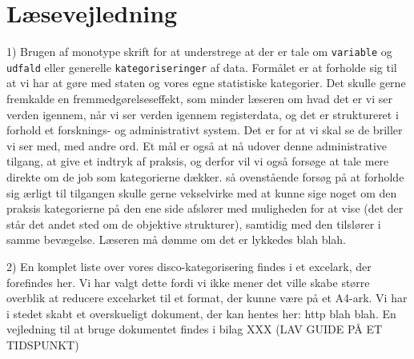 

\section{Læsevejledning \label{}}


1)
Brugen af monotype skrift for at understrege at der er tale om \texttt{variable} og \texttt{udfald} eller generelle \texttt{kategoriseringer} af data. Formålet er at forholde sig til at vi har at gøre med staten og vores egne statistiske kategorier. Det skulle gerne fremkalde en fremmedgørelseseffekt, som minder læseren om hvad det er vi ser verden igennem, når vi ser verden igennem registerdata, og det er struktureret i forhold et forsknings- og administrativt system. Det er for at vi skal se de briller vi ser med, med andre ord. Et mål er også at nå udover denne administrative tilgang, at give et indtryk af praksis, og derfor vil vi også forsøge at tale mere direkte om de job som kategorierne dækker. så ovenstående forsøg på at forholde sig ærligt til tilgangen skulle gerne vekselvirke med at kunne sige noget om den praksis kategorierne på den ene side afslører med muligheden for at vise (det der står det andet sted om de objektive strukturer), samtidig med den tilslører i samme bevægelse. Læseren må dømme om det er lykkedes blah blah.

2) 
En komplet liste over vores disco-kategorisering findes i et excelark, der forefindes her. Vi har valgt dette fordi vi ikke mener det ville skabe større overblik at reducere excelarket til et format, der kunne være på et A4-ark. Vi har i stedet skabt et overskueligt dokument, der kan hentes her: http blah blah. En vejledning til at bruge dokumentet findes i bilag XXX (LAV GUIDE PÅ ET TIDSPUNKT)






